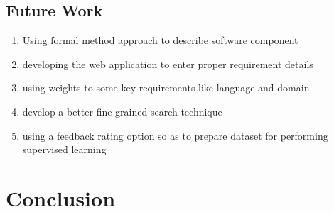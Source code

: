 \documentclass[a4paper,12pt]{article}
\begin{document}
\subsection{Future Work}
\begin{enumerate}
    \item Using formal method approach to describe software component
    \item developing the web application to enter proper requirement details
    \item using weights to some key requirements like language and domain
    \item develop a better fine grained search technique
    \item using a feedback rating option so as to prepare dataset for performing supervised learning
\end{enumerate}
\section{Conclusion}

% 
% 
\end{document}
